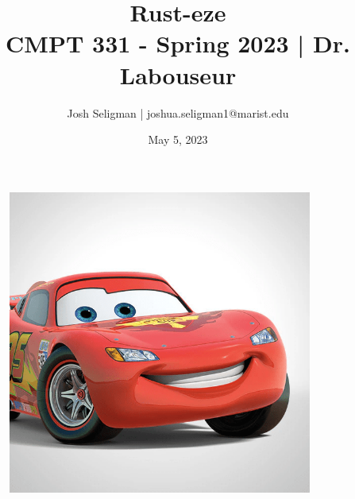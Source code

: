 \documentclass[letterpaper, 10pt, DIV=13]{scrartcl}
\title {
	\normalfont
	\huge{Rust-eze} \\
	\vspace{10pt}
	\large{CMPT 331 - Spring 2023 | Dr. Labouseur}
}
\author{\normalfont Josh Seligman | joshua.seligman1@marist.edu}
\date{\normalfont May 5, 2023}
\numberwithin{equation}{section}
\numberwithin{figure}{section}
\numberwithin{table}{section}
\begin{document}
\maketitle

\begin{figure}[ht]
  \centering
  \includegraphics[width = 10cm]{lightning_mcqueen.png}
\end{figure}

\newpage
\end{document}
